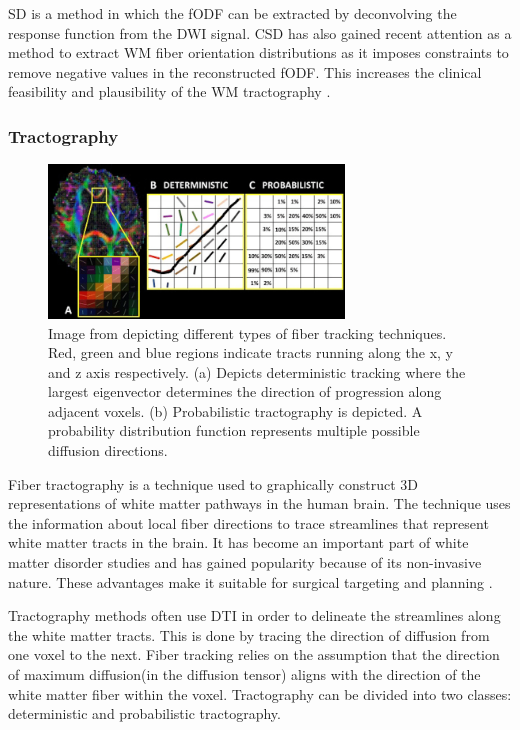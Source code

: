 \documentclass[msthesis.tex]{subfiles}
\begin{document}
\gls{SD} \citep{dell2019modelling} is a method in which the \gls{fODF} can be extracted by deconvolving the response function from the \gls{DWI} signal. \Gls{CSD} has also gained recent attention as a method to extract \gls{WM} fiber orientation distributions as it imposes constraints to remove negative values in the reconstructed \gls{fODF}. This increases the clinical feasibility and plausibility of the \gls{WM} tractography \citep{JEURISSEN2014411}.

\subsubsection{Tractography}
\label{subsub:tractography}
\begin{figure}
    \centering
    \includegraphics[width=0.7\textwidth]{images/A-Degree-of-anisotropy-B-Deterministic-fiber-tracking-the-fiber-path-across-voxels-is.png}
    \caption{Image from \cite{muller2018clinically} depicting different types of fiber tracking techniques. Red, green and blue regions indicate tracts running along the x, y and z axis respectively. (a) Depicts deterministic tracking where the largest eigenvector determines the direction of progression along adjacent voxels. (b) Probabilistic tractography is depicted. A probability distribution function represents multiple possible diffusion directions.}
    \label{fig:tracking}
\end{figure}
Fiber tractography is a technique used to graphically construct  3D representations of white matter pathways in the human brain. The technique uses the information about local fiber directions to trace streamlines that represent white matter tracts in the brain. It has become an important part of white matter disorder studies and has gained popularity because of its non-invasive nature. These advantages make it suitable for surgical targeting and planning \citep{romano2009pre}.

Tractography methods often use \gls{DTI} in order to delineate the streamlines along the white matter tracts. This is done by tracing the direction of diffusion from one voxel to the next. Fiber tracking relies on the assumption that the direction of maximum diffusion(in the diffusion tensor) aligns with the direction of the white matter fiber within the voxel. Tractography can be divided into two classes: deterministic and probabilistic tractography.
\end{document}
